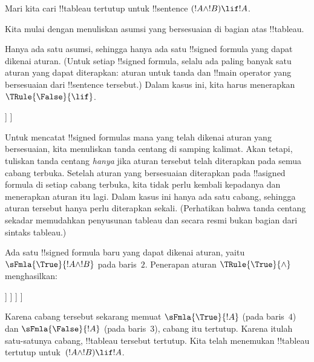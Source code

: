 \documentclass[../../../include/open-logic-section]{subfiles}
\begin{document}
{}
{}


\begin{ex}
Mari kita cari !!{tableau} tertutup untuk !!{sentence} $(!A \land !B) \lif !A$.

Kita mulai dengan menuliskan asumsi yang bersesuaian di bagian atas
!!{tableau}.
\begin{oltableau}
  [\sFmla{\False}{(\formula{A} \land \formula{B}) \lif \formula{A}},
    just = \TAss]
\end{oltableau}

Hanya ada satu asumsi, sehingga hanya ada satu !!{signed formula} yang
dapat dikenai aturan. (Untuk setiap !!{signed formula}, selalu ada paling
banyak satu aturan yang dapat diterapkan: aturan untuk tanda dan
!!{main operator} yang bersesuaian dari !!{sentence} tersebut.) Dalam
kasus ini, kita harus menerapkan $\TRule{\False}{\lif}$.
\begin{oltableau}
  [\sFmla{\False}{(\formula{A} \land \formula{B}) \lif \formula{A}},
    checked, just = \TAss
    [\sFmla{\True}{\formula{A} \land \formula{B}},
      just={\TRule{\False}{\lif}[1]}
      [\sFmla{\False}{\formula{A}}, just={\TRule{\False}{\lif}[1]}]
    ]
  ]
\end{oltableau}
Untuk mencatat !!{signed formula}s mana yang telah dikenai aturan yang
bersesuaian, kita menuliskan tanda centang di samping kalimat. Akan
tetapi, tuliskan tanda centang \emph{hanya} jika aturan tersebut telah
diterapkan pada semua cabang terbuka. Setelah aturan yang bersesuaian
diterapkan pada !!a{signed formula} di setiap cabang terbuka, kita tidak
perlu kembali kepadanya dan menerapkan aturan itu lagi. Dalam kasus ini
hanya ada satu cabang, sehingga aturan tersebut hanya perlu diterapkan
sekali. (Perhatikan bahwa tanda centang sekadar memudahkan penyusunan
tableau dan secara resmi bukan bagian dari sintaks tableau.)

Ada satu !!{signed formula} baru yang dapat dikenai aturan, yaitu
$\sFmla{\True}{!A \land !B}$ pada baris~$2$. Penerapan aturan
$\TRule{\True}{\land}$ menghasilkan:
\begin{oltableau}
  [\sFmla{\False}{(\formula{A} \land \formula{B}) \lif \formula{A}},
    checked, just = \TAss
    [\sFmla{\True}{\formula{A} \land \formula{B}},
      just={\TRule{\False}{\lif}[1]}, checked
      [\sFmla{\False}{\formula{A}}, just={\TRule{\False}{\lif}[1]}
        [\sFmla{\True}{\formula{A}}, just={\TRule{\True}{\land}[2]}
          [\sFmla{\True}{\formula{B}}, just={\TRule{\True}{\land}[2]}, close
          ]
        ]
      ]
    ]
  ]
\end{oltableau}
Karena cabang tersebut sekarang memuat $\sFmla{\True}{!A}$ (pada
baris~$4$) dan $\sFmla{\False}{!A}$ (pada baris~$3$), cabang itu
tertutup. Karena itulah satu-satunya cabang, !!{tableau} tersebut
tertutup. Kita telah menemukan !!{tableau} tertutup
untuk~$(!A \land !B) \lif !A$.
\end{ex}
\end{document}
